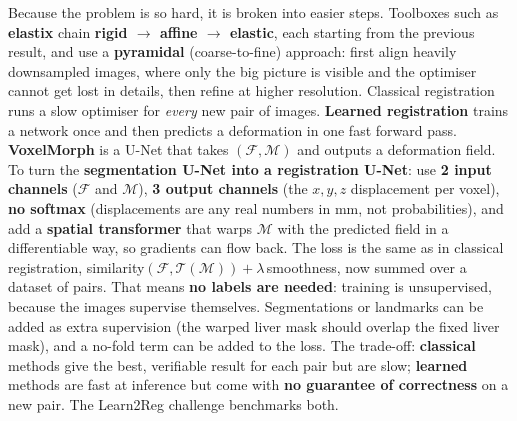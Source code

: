 \documentclass[a4paper]{article}
\newcommand{\K}[1]{\textcolor{kg}{\textbf{#1}}}
\newcommand{\F}[1]{\textcolor{fb}{#1}}
\newcommand{\E}[1]{\textcolor{ep}{#1}}
\newcommand{\T}[1]{\textcolor{tr}{\textbf{#1}}}
\newcommand{\ra}{\ensuremath{\to}}
\begin{document}
Because the problem is so hard, it is broken into easier steps. Toolboxes such as \K{elastix} chain \K{rigid \ra{} affine \ra{} elastic}, each starting from the previous result, and use a \K{pyramidal} (coarse-to-fine) approach: first align heavily downsampled images, where only the big picture is visible and the optimiser cannot get lost in details, then refine at higher resolution.
Classical registration runs a slow optimiser for \emph{every} new pair of images. \K{Learned registration} trains a network once and then predicts a deformation in one fast forward pass. \K{VoxelMorph} is a U-Net that takes $(\mathcal F,\mathcal M)$ and outputs a deformation field. To turn the \K{segmentation U-Net into a registration U-Net}: use \K{2 input channels} ($\mathcal F$ and $\mathcal M$), \K{3 output channels} (the $x,y,z$ displacement per voxel), \T{no softmax} (displacements are any real numbers in mm, not probabilities), and add a \K{spatial transformer} that warps $\mathcal M$ with the predicted field in a differentiable way, so gradients can flow back. The loss is the same as in classical registration, \F{similarity$(\mathcal F,\mathcal T(\mathcal M))+\lambda\,$smoothness}, now summed over a dataset of pairs. That means \T{no labels are needed}: training is unsupervised, because the images supervise themselves. Segmentations or landmarks can be added as extra supervision (\E{the warped liver mask should overlap the fixed liver mask}), and a no-fold term can be added to the loss. The trade-off: \K{classical} methods give the best, verifiable result for each pair but are slow; \K{learned} methods are fast at inference but come with \T{no guarantee of correctness} on a new pair. The Learn2Reg challenge benchmarks both.
\end{document}
